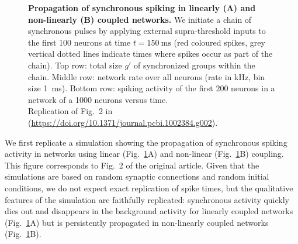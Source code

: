\documentclass[10pt,a4paper,onecolumn]{article}
\begin{document}
\begin{figure}
\begin{subfigure}[t]{0.5\textwidth}
\end{subfigure}
\caption{\label{fig:raster}
\textbf{Propagation of synchronous spiking in linearly (A) and non-linearly (B) coupled networks.} We initiate a chain of synchronous pulses by applying external supra-threshold inputs to the first 100 neurons at time $t=\SI{150}{\milli\second}$ (red coloured spikes, grey vertical dotted lines indicate times where spikes occur as part of the chain). Top row: total size $g'$ of synchronized groups within the chain. Middle row: network rate over all neurons (rate in \si{\kilo\hertz}, bin size \SI{1}{\milli\second}). Bottom row: spiking activity of the first 200 neurons in a network of a 1000 neurons versus time.\\
Replication of Fig.~2 in \cite{Memmesheimer2012} (\url{https://doi.org/10.1371/journal.pcbi.1002384.g002}).}
\end{figure}

We first replicate a simulation showing the propagation of synchronous spiking activity in networks using linear (Fig.~\ref{fig:raster}A) and non-linear (Fig.~\ref{fig:raster}B) coupling. This figure corresponds to Fig.~2 of the original article. Given that the simulations are based on random synaptic connections and random initial conditions, we do not expect exact replication of spike times, but the qualitative features of the simulation are faithfully replicated: synchronous activity quickly dies out and disappears in the background activity for linearly coupled networks (Fig.~\ref{fig:raster}A) but is persistently propagated in non-linearly coupled networks (Fig.~\ref{fig:raster}B).
\end{document}
